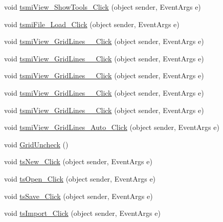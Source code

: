\begin{DoxyCompactItemize}
\item 
void \mbox{\hyperlink{class_paint___program_1_1_form1_afb55a14b678ab19fc42e1aff3d190cf1}{tsmi\+View\+\_\+\+Show\+Tools\+\_\+\+Click}} (object sender, Event\+Args e)
\item 
void \mbox{\hyperlink{class_paint___program_1_1_form1_a066847af57fc8d12dcc93a18b2084e1d}{tsmi\+File\+\_\+\+Load\+\_\+\+Click}} (object sender, Event\+Args e)
\item 
void \mbox{\hyperlink{class_paint___program_1_1_form1_ad8663ccaa3bb8c17520b87a2f79b906b}{tsmi\+View\+\_\+\+Grid\+Lines\+\_\+\_\+\+Click}} (object sender, Event\+Args e)
\item 
void \mbox{\hyperlink{class_paint___program_1_1_form1_a401f344c60c39f120f98731bc23e6415}{tsmi\+View\+\_\+\+Grid\+Lines\+\_\+\_\+\+Click}} (object sender, Event\+Args e)
\item 
void \mbox{\hyperlink{class_paint___program_1_1_form1_ad1af9f3fd6306268779f97af6c9bf054}{tsmi\+View\+\_\+\+Grid\+Lines\+\_\+\_\+\+Click}} (object sender, Event\+Args e)
\item 
void \mbox{\hyperlink{class_paint___program_1_1_form1_a4f38071737883248aefad98e676c8a14}{tsmi\+View\+\_\+\+Grid\+Lines\+\_\+\_\+\+Click}} (object sender, Event\+Args e)
\item 
void \mbox{\hyperlink{class_paint___program_1_1_form1_a61049a8cba02180625f433f1fdb0113d}{tsmi\+View\+\_\+\+Grid\+Lines\+\_\+\_\+\+Click}} (object sender, Event\+Args e)
\item 
void \mbox{\hyperlink{class_paint___program_1_1_form1_a81d01950f81314638c4f6d1f2f9c96ae}{tsmi\+View\+\_\+\+Grid\+Lines\+\_\+\+Auto\+\_\+\+Click}} (object sender, Event\+Args e)
\item 
void \mbox{\hyperlink{class_paint___program_1_1_form1_a2531d9adc858d169c9d5ae28f5f37167}{Grid\+Uncheck}} ()
\item 
void \mbox{\hyperlink{class_paint___program_1_1_form1_aca637babfc060679e4cb8503bad2da61}{ts\+New\+\_\+\+Click}} (object sender, Event\+Args e)
\item 
void \mbox{\hyperlink{class_paint___program_1_1_form1_a6f1ef54129cbca7c8687e1c14385a946}{ts\+Open\+\_\+\+Click}} (object sender, Event\+Args e)
\item 
void \mbox{\hyperlink{class_paint___program_1_1_form1_a4665134233fd7f948c22a67926714637}{ts\+Save\+\_\+\+Click}} (object sender, Event\+Args e)
\item 
void \mbox{\hyperlink{class_paint___program_1_1_form1_aa06525b16106bf9578389c8cd87ea8b4}{ts\+Import\+\_\+\+Click}} (object sender, Event\+Args e)

\end{DoxyCompactItemize}
